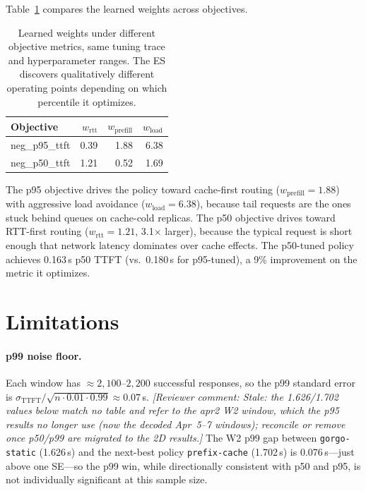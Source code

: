 \documentclass{article}
\newcommand{\cmt}[1]{\textcolor{green!45!black}{\textit{[Reviewer comment: #1]}}}
\begin{document}
Table~\ref{tab:weights_compare} compares the learned weights across objectives.

\begin{table}[t]
\centering
\small
\caption{Learned weights under different objective metrics, same tuning trace and
  hyperparameter ranges. The ES discovers qualitatively different operating
  points depending on which percentile it optimizes.}
\label{tab:weights_compare}
\begin{tabular}{lrrr}
\toprule
Objective & $w_{\mathrm{rtt}}$ & $w_{\mathrm{prefill}}$ & $w_{\mathrm{load}}$ \\
\midrule
neg\_p95\_ttft & 0.39 & 1.88 & 6.38 \\
neg\_p50\_ttft & 1.21 & 0.52 & 1.69 \\
\bottomrule
\end{tabular}
\end{table}

The p95 objective drives the policy toward cache-first routing
($w_{\mathrm{prefill}}{=}1.88$) with aggressive load avoidance
($w_{\mathrm{load}}{=}6.38$), because tail requests are the ones stuck behind
queues on cache-cold replicas. The p50 objective drives toward RTT-first
routing ($w_{\mathrm{rtt}}{=}1.21$, 3.1$\times$ larger), because the typical
request is short enough that network latency dominates over cache effects.
The p50-tuned policy achieves 0.163\,s p50 TTFT (vs.\ 0.180\,s for p95-tuned),
a 9\% improvement on the metric it optimizes.



\section{Limitations}
\label{sec:limitations}

\paragraph{p99 noise floor.}
Each window has $\approx\!2{,}100$--$2{,}200$ successful responses, so the p99
standard error is $\sigma_{\mathrm{TTFT}}/\sqrt{n\cdot 0.01\cdot 0.99}\approx
0.07$\,s. \cmt{Stale: the 1.626/1.702 values below match no table and refer to
the apr2 W2 window, which the p95 results no longer use (now the decoded
Apr~5--7 windows); reconcile or remove once p50/p99 are migrated to the 2D
results.} The W2 p99 gap between \texttt{gorgo-static} (1.626\,s) and
the next-best policy \texttt{prefix-cache} (1.702\,s) is 0.076\,s---just above
one SE---so the p99 win, while directionally consistent with p50 and p95, is not
individually significant at this sample size.
\end{document}

